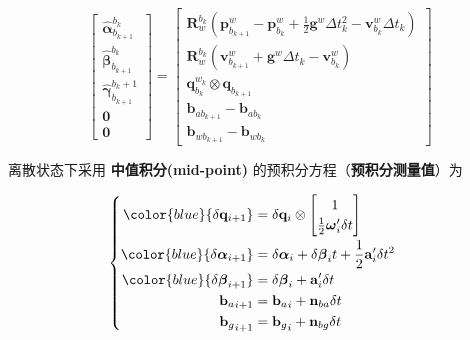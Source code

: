 \documentclass[12pt,a4paper]{article}
\begin{document}
\begin{equation}
\label{equ:preinte_estimate}
\left[\begin{array}{c}
{\hat{\boldsymbol{\alpha}}_{b_{k+1}}^{b_{k}}} \\ 
{\hat{\boldsymbol{\beta}}_{b_{k+1}}^{b_{k}}}  \\ 
{\hat{\boldsymbol{\gamma}}_{b_{k+1}}^{b_{k}+1}} \\ 
{\mathbf{0}} \\ 
{\mathbf{0}}
\end{array}\right]=
\left[\begin{array}{c}
{\mathbf{R}_{w}^{b_{k}}\left(\mathbf{p}_{b_{k+1}}^{w}-\mathbf{p}_{b_{k}}^{w}+\frac{1}{2} \mathbf{g}^{w} \Delta t_{k}^{2}-\mathbf{v}_{b_{k}}^{w} \Delta t_{k}\right)} \\
{\mathbf{R}_{w}^{b_{k}}\left(\mathbf{v}_{b_{k+1}}^{w}+\mathbf{g}^{w} \Delta t_{k}-\mathbf{v}_{b_{k}}^{w}\right)} \\ 
{\mathbf{q}_{b_{k}}^{w_{k}} \otimes \mathbf{q}_{b_{k+1}}} \\ 
{\mathbf{b}_{a b_{k+1}}-\mathbf{b}_{a b_{k}}} \\ 
{\mathbf{b}_{w b_{k+1}}-\mathbf{b}_{w b_{k}}}
\end{array}\right]
\end{equation}


离散状态下采用 \textbf{中值积分(mid-point)} 的预积分方程（\textbf{预积分测量值}）为

\begin{equation}
\label{equ:preinte_measure}
\begin{cases}
\begin{aligned}
\color{blue}{\delta \mathbf{q}_{i+1}} &= 
\delta \mathbf{q}_{i} \otimes 
\begin{bmatrix} 1 \\ \frac{1}{2} \boldsymbol{\omega}_{i}^{\prime} \delta t \end{bmatrix} \\
\color{blue}{\delta \boldsymbol{\alpha}_{i+1}} &= 
\delta \boldsymbol{\alpha}_{i} + \delta \boldsymbol{\beta}_{i}t + \frac{1}{2} \mathbf{a}_{i}^{\prime} \delta t^{2} \\
\color{blue}{\delta \boldsymbol{\beta}_{i+1}} &= 
\delta \boldsymbol{\beta}_{i}+\mathbf{a}_{i}^{\prime} \delta t \\
{\mathbf{b}_a}_{i+1} &= {\mathbf{b}_a}_i + \mathbf{n}_{ba} \delta t \\
{\mathbf{b}_g}_{i+1} &= {\mathbf{b}_g}_i + \mathbf{n}_{bg} \delta t
\end{aligned}
\end{cases}
\end{equation}
\end{document}
